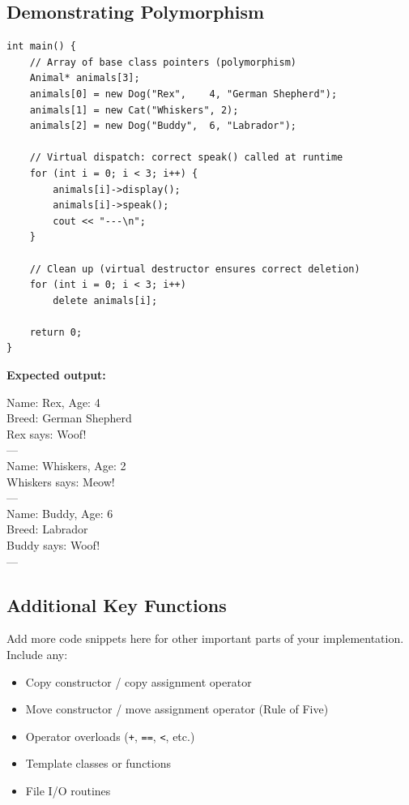 \documentclass[11pt]{article}
\begin{document}
\subsection{Demonstrating Polymorphism}

\begin{lstlisting}[caption={Using base class pointers for polymorphic behaviour}]
int main() {
    // Array of base class pointers (polymorphism)
    Animal* animals[3];
    animals[0] = new Dog("Rex",    4, "German Shepherd");
    animals[1] = new Cat("Whiskers", 2);
    animals[2] = new Dog("Buddy",  6, "Labrador");

    // Virtual dispatch: correct speak() called at runtime
    for (int i = 0; i < 3; i++) {
        animals[i]->display();
        animals[i]->speak();
        cout << "---\n";
    }

    // Clean up (virtual destructor ensures correct deletion)
    for (int i = 0; i < 3; i++)
        delete animals[i];

    return 0;
}
\end{lstlisting}

\textbf{Expected output:}
\begin{tcolorbox}[colback=black!88, coltext=green!80,
                  fontupper=\ttfamily\small, boxrule=0pt, arc=2pt]
Name: Rex, Age: 4\\
Breed: German Shepherd\\
Rex says: Woof!\\
---\\
Name: Whiskers, Age: 2\\
Whiskers says: Meow!\\
---\\
Name: Buddy, Age: 6\\
Breed: Labrador\\
Buddy says: Woof!\\
---
\end{tcolorbox}

\subsection{Additional Key Functions}
Add more code snippets here for other important parts of your implementation. Include any:
\begin{itemize}
    \item Copy constructor / copy assignment operator
    \item Move constructor / move assignment operator (Rule of Five)
    \item Operator overloads (\texttt{+}, \texttt{==}, \texttt{<}, etc.)
    \item Template classes or functions
    \item File I/O routines
\end{itemize}
\end{document}

